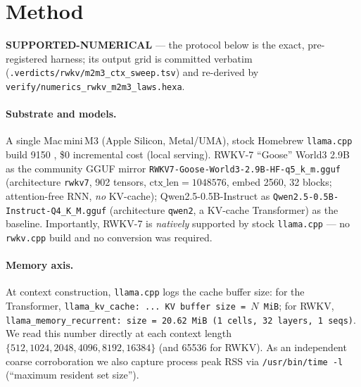 \documentclass[11pt,a4paper]{article}
\newcommand{\green}[1]{\textcolor{green!50!black}{\textbf{#1}}}
\begin{document}
\section{Method}
\label{sec:method}
\green{SUPPORTED-NUMERICAL} --- the protocol below is the exact, pre-registered
harness; its output grid is committed verbatim
(\texttt{.verdicts/rwkv/m2m3\_ctx\_sweep.tsv}) and re-derived by
\texttt{verify/numerics\_rwkv\_m2m3\_laws.hexa}.

\paragraph{Substrate and models.}
A single Mac\,mini\,M3 (Apple Silicon, Metal/UMA), stock Homebrew
\texttt{llama.cpp} build 9150 \citep{llamacpp}, \$0 incremental cost (local
serving). RWKV-7 ``Goose'' World3 2.9B as the community GGUF mirror
\texttt{RWKV7-Goose-World3-2.9B-HF-q5\_k\_m.gguf} (architecture \texttt{rwkv7},
902 tensors, \(\mathrm{ctx\_len}=\num{1048576}\), embed 2560, 32 blocks;
attention-free RNN, \emph{no} KV-cache); Qwen2.5-0.5B-Instruct as
\texttt{Qwen2.5-0.5B-Instruct-Q4\_K\_M.gguf} (architecture \texttt{qwen2}, a
KV-cache Transformer) as the baseline. Importantly, RWKV-7 is \emph{natively}
supported by stock \texttt{llama.cpp} --- no \texttt{rwkv.cpp} build and no
conversion was required.

\paragraph{Memory axis.}
At context construction, \texttt{llama.cpp} logs the cache buffer size: for the
Transformer, \texttt{llama\_kv\_cache:\ ...\ KV buffer size = $N$ MiB}; for
RWKV, \texttt{llama\_memory\_recurrent:\ size = 20.62 MiB (1 cells, 32 layers, 1
seqs)}. We read this number directly at each context length
\(\{512, 1024, 2048, 4096, 8192, \num{16384}\}\) (and \num{65536} for RWKV).
As an independent coarse corroboration we also capture process peak RSS via
\texttt{/usr/bin/time -l} (``maximum resident set size'').
\end{document}
